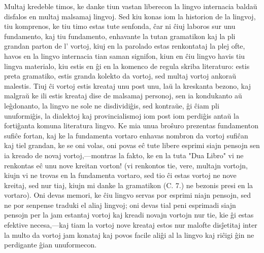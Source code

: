 \documentclass[12pt,twoside]{book}
\begin{document}
Multaj kredeble timos, ke danke tiun vastan liberecon la lingvo internacia baldaŭ disfalos en multaj malsamaj lingvoj. Sed kiu konas iom la historion de la lingvoj, tiu komprenos, ke tiu timo estas tute senfonda, ĉar ni ĉiuj laboros sur unu fundamento, kaj tiu fundamento, enhavante la tutan gramatikon kaj la pli grandan parton de l' vortoj, kiuj en la parolado estas renkontataj la plej ofte, havos en la lingvo internacia tian saman signifon, kiun en ĉiu lingvo havis tiu lingva materialo, kiu estis en ĝi en la komenco de regula skriba literaturo: estis preta gramatiko, estis granda kolekto da vortoj, sed multaj vortoj ankoraŭ malestis. Tiuj ĉi vortoj estis kreataj unu post unu, laŭ la kreskanta bezono, kaj malgraŭ ke ili estis kreataj dise de malsamaj personoj, sen ia kondukanto aŭ leĝdonanto, la lingvo ne sole ne disdividiĝis, sed kontraŭe, ĝi ĉiam pli unuformiĝis, la dialektoj kaj provincialismoj iom post iom perdiĝis antaŭ la fortiĝanta komuna literatura lingvo. Ke mia unua broŝuro prezentas fundamenton sufiĉe fortan, kaj ke la fundamenta vortaro enhavas nombron da vortoj sufiĉan kaj tiel grandan, ke se oni volas, oni povas eĉ tute libere esprimi siajn pensojn sen ia kreado de novaj vortoj,—montras la fakto, ke en la tuta "Dua Libro" vi ne renkontas eĉ unu nove kreitan vorton! (vi renkontos tie, vere, multajn vortojn, kiujn vi ne trovas en la fundamenta vortaro, sed tio ĉi estas vortoj ne nove kreitaj, sed nur tiaj, kiujn mi danke la gramatikon (C. 7.) ne bezonis presi en la vortaro). Oni devas memori, ke ĉiu lingvo servas por esprimi niajn pensojn, sed ne por senpense traduki el aliaj lingvoj; oni devas tial peni esprimadi siajn pensojn per la jam estantaj vortoj kaj kreadi novajn vortojn nur tie, kie ĝi estas efektive necesa,—kaj tiam la vortoj nove kreataj estos nur malofte disĵetitaj inter la multo da vortoj jam konataj kaj povos facile aliĝi al la lingvo kaj riĉigi ĝin ne perdigante ĝian unuformecon.
\end{document}
